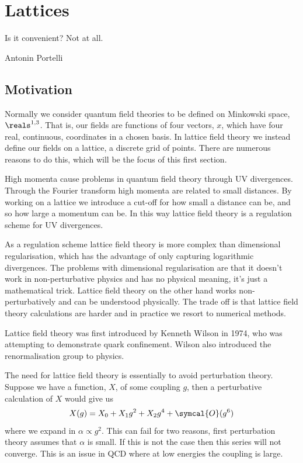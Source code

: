 \documentclass[fleqn]{NotesClass}
\newcommand{\order}{\symcal{O}}
\newcommand{\minkowskiSpace}{\reals^{1,3}}
\begin{document}
    \chapter{Lattices}
    \epigraph{Is it convenient? Not at all.}{Antonin Portelli}
    \section{Motivation}
    Normally we consider quantum field theories to be defined on Minkowski space, \(\minkowskiSpace\).
    That is, our fields are functions of four vectors, \(x\), which have four real, continuous, coordinates in a chosen basis.
    In lattice field theory we instead define our fields on a lattice, a discrete grid of points.
    There are numerous reasons to do this, which will be the focus of this first section.
    
    High momenta cause problems in quantum field theory through UV divergences.
    Through the Fourier transform high momenta are related to small distances.
    By working on a lattice we introduce a cut-off for how small a distance can be, and so how large a momentum can be.
    In this way lattice field theory is a regulation scheme for UV divergences.
    
    As a regulation scheme lattice field theory is more complex than dimensional regularisation, which has the advantage of only capturing logarithmic divergences.
    The problems with dimensional regularisation are that it doesn't work in non-perturbative physics and has no physical meaning, it's just a mathematical trick.
    Lattice field theory on the other hand works non-perturbatively and can be understood physically.
    The trade off is that lattice field theory calculations are harder and in practice we resort to numerical methods.
    
    Lattice field theory was first introduced by Kenneth Wilson in 1974, who was attempting to demonstrate quark confinement.
    Wilson also introduced the renormalisation group to physics.
    
    The need for lattice field theory is essentially to avoid perturbation theory.
    Suppose we have a function, \(X\), of some coupling \(g\), then a perturbative calculation of \(X\) would give us
    \begin{equation}
        X(g) = X_0 + X_1 g^2 + X_2 g^4 + \order(g^6)
    \end{equation}
    where we expand in \(\alpha \propto g^2\).
    This can fail for two reasons, first perturbation theory assumes that \(\alpha\) is small.
    If this is not the case then this series will not converge.
    This is an issue in QCD where at low energies the coupling is large.
    
\end{document}
